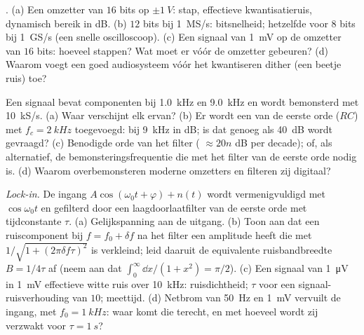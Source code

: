 \begin{exercise}[$\star\star$]\label{exo:b2:feedback-oscillators:8}
. (a) Een omzetter van $16$ bits op $\pm\qty{1}{V}$: stap,
effectieve kwantisatieruis, dynamisch bereik in dB. (b) $12$ bits bij
\qty{1}{MS/s}: bitsnelheid; hetzelfde voor $8$ bits bij \qty{1}{GS/s} (een
snelle oscilloscoop). (c) Een signaal van \qty{1}{mV} op de omzetter van
$16$ bits: hoeveel stappen? Wat moet er vóór de omzetter gebeuren? (d)
Waarom voegt een goed audiosysteem vóór het kwantiseren dither (een beetje
ruis) toe?
\end{exercise}

\begin{exercise}[$\star\star$]\label{exo:b2:feedback-oscillators:9}
Een signaal bevat componenten bij \qty{1.0}{kHz} en \qty{9.0}{kHz} en wordt
bemonsterd met \qty{10}{kS/s}. (a) Waar verschijnt elk ervan? (b) Er wordt
een  van de eerste orde ($RC$) met $f_c = \qty{2}{kHz}$
toegevoegd:  bij \qty{9}{kHz} in dB; is dat genoeg als
\qty{40}{dB} wordt gevraagd? (c) Benodigde orde van het filter (
$\approx 20n$ dB per decade); of, als alternatief, de
bemonsteringsfrequentie die met het filter van de eerste orde nodig is. (d)
Waarom overbemonsteren moderne omzetters en filteren zij digitaal?
\end{exercise}

\begin{exercise}[$\star\star\star$]\label{exo:b2:feedback-oscillators:10}
\emph{Lock-in.} De ingang $A\cos(\omega_0t + \varphi) + n(t)$ wordt
vermenigvuldigd met $\cos\omega_0t$ en gefilterd door een laagdoorlaatfilter
van de eerste orde met tijdconstante $\tau$. (a) Gelijkspanning aan de
uitgang. (b) Toon aan dat een ruiscomponent bij $f = f_0 + \delta f$ na het
filter een amplitude heeft die met $1/\sqrt{1 + (2\pi\delta f\tau)^2}$ is
verkleind; leid daaruit de equivalente ruisbandbreedte $B = 1/4\tau$ af
(neem aan dat $\int_0^\infty
\dd x/(1 + x^2) = \pi/2$). (c) Een signaal van
\qty{1}{\micro V} in \qty{1}{mV} effectieve witte ruis over \qty{10}{kHz}:
ruisdichtheid; $\tau$ voor een signaal-ruisverhouding van $10$; meettijd.
(d) Netbrom van \qty{50}{Hz} en \qty{1}{mV} vervuilt de ingang, met
$f_0 = \qty{1}{kHz}$: waar komt die terecht, en met hoeveel wordt zij
verzwakt voor $\tau = \qty{1}{s}$?
\end{exercise}

